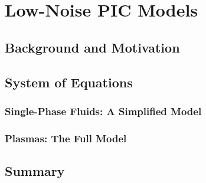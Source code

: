 \chapter{Low-Noise PIC Models}


    \section{Background and Motivation}


    \section{System of Equations}

        
        \subsection*{Single-Phase Fluids: A Simplified Model}


        \subsection*{Plasmas: The Full Model}


    \section*{Summary}
    